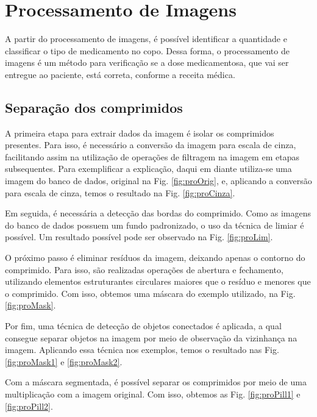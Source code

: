 \section{Processamento de Imagens}\label{sec:processamento_imagens}

A partir do  processamento de imagens, é possível identificar a quantidade e classificar o tipo de medicamento no copo. Dessa forma, o processamento de imagens é um método para verificação se a dose medicamentosa, que vai ser entregue ao paciente, está correta, conforme a receita médica.

\subsection{Separação dos comprimidos}

A primeira etapa para extrair dados da imagem é isolar os comprimidos presentes. Para isso, é necessário a conversão da imagem para escala de cinza, facilitando assim na utilização de operações de filtragem na imagem em etapas subsequentes. Para exemplificar a explicação, daqui em diante utiliza-se uma imagem do banco de dados, original na Fig. \ref{fig:proOrig}, e, aplicando a conversão para escala de cinza, temos o resultado na Fig. \ref{fig:proCinza}.

Em seguida, é necessária a detecção das bordas do comprimido. Como as imagens do banco de dados possuem um fundo padronizado, o uso da técnica de limiar é possível. Um resultado possível pode ser observado na Fig. \ref{fig:proLim}. 

O próximo passo é eliminar resíduos da imagem, deixando apenas o contorno do comprimido. Para isso, são realizadas operações de abertura e fechamento, utilizando elementos estruturantes circulares maiores que o resíduo e menores que o comprimido. Com isso, obtemos uma máscara do exemplo utilizado, na Fig. \ref{fig:proMask}.

Por fim, uma técnica de detecção de objetos conectados é aplicada, a qual consegue separar objetos na imagem por meio de observação da vizinhança na imagem. Aplicando essa técnica nos exemplos, temos o resultado nas Fig. \ref{fig:proMask1} e \ref{fig:proMask2}. 

Com a máscara segmentada, é possível separar os comprimidos por meio de uma multiplicação com a imagem original. Com isso, obtemos as Fig. \ref{fig:proPill1} e \ref{fig:proPill2}.

